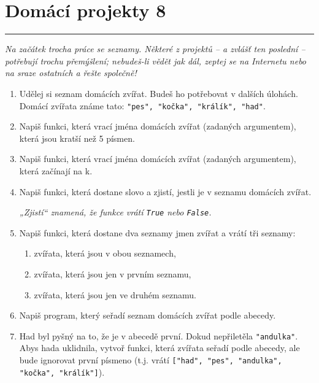 \documentclass[a4paper,10pt]{article}
\newcommand\plsetno{8}
\newcommand\startsection[1]{
     \vspace{0.2ex}
    \hrule
    {\fontspec{Oxygen} \tiny
     \vspace{-1ex}
     \emph{#1}
     \vspace{-1.5em}
    }
}
\begin{document}
\section*{Domácí projekty \plsetno}

\startsection{Na začátek trocha práce se seznamy.
    Některé z projektů – a zvlášť ten poslední – potřebují trochu přemýšlení;
    nebudeš-li vědět jak dál, zeptej se na Internetu nebo na sraze ostatních
    a řešte společně!}

\begin{enumerate}

\item Udělej si seznam domácích zvířat. Budeš ho potřebovat v dalších úlohách.
    \\Domácí zvířata známe tato: \verb+"pes", "kočka", "králík", "had"+.


\item Napiš funkci, která vrací jména domácích zvířat (zadaných argumentem), která jsou kratší než 5 písmen.

\item Napiš funkci, která vrací jména  domácích zvířat (zadaných argumentem), která začínají na k.

\item Napiš funkci, která dostane slovo a zjistí,
    jestli je v seznamu domácích zvířat.

    \emph{„Zjistí“ znamená, že funkce vrátí \texttt{True} nebo \texttt{False}.}

\item Napiš funkci, která dostane dva seznamy jmen zvířat a vrátí tři seznamy:
    \begin{enumerate}
        \item zvířata, která jsou v obou seznamech,
        \item zvířata, která jsou jen v prvním seznamu,
        \item zvířata, která jsou jen ve druhém seznamu.
    \end{enumerate}

\item Napiš program, který seřadí seznam domácích zvířat podle abecedy.

\item Had byl pyšný na to, že je v abecedě první.
    Dokud nepřiletěla \verb+"andulka"+.
    \\Abys hada uklidnila, vytvoř funkci, která zvířata seřadí podle abecedy,
    ale bude ignorovat první písmeno (t.j. vrátí
        \texttt{["h{\color{plpink}ad}",
                 "p{\color{plpink}es}",
                 "a{\color{plpink}ndulka}",
                 "k{\color{plpink}očka}",
                 "k{\color{plpink}rálík}"]}).


\end{enumerate}
\end{document}
